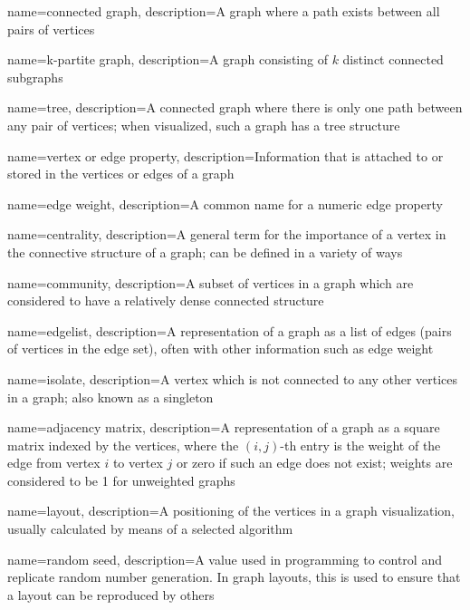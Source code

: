 {
    name={connected graph},
    description={A graph where a path exists between all pairs of vertices}
}

{
    name={k-partite graph},
    description={A graph consisting of $k$ distinct connected subgraphs}
}

{
    name={tree},
    description={A connected graph where there is only one path between any pair of vertices; when visualized, such a graph has a tree structure}
}

{
    name={vertex or edge property},
    description={Information that is attached to or stored in the vertices or edges of a graph}
}

{
    name={edge weight},
    description={A common name for a numeric edge property}
}

{
    name={centrality},
    description={A general term for the importance of a vertex in the connective structure of a graph; can be defined in a variety of ways}
}

{
    name={community},
    description={A subset of vertices in a graph which are considered to have a relatively dense connected structure}
}

{
    name={edgelist},
    description={A representation of a graph as a list of edges (pairs of vertices in the edge set), often with other information such as edge weight}
}

{
    name={isolate},
    description={A vertex which is not connected to any other vertices in a graph; also known as a singleton}
}

{
    name={adjacency matrix},
    description={A representation of a graph as a square matrix indexed by the vertices, where the $(i,j)$-th entry is the weight of the edge from vertex $i$ to vertex $j$ or zero if such an edge does not exist; weights are considered to be 1 for unweighted graphs}
}

{
    name={layout},
    description={A positioning of the vertices in a graph visualization, usually calculated by means of a selected algorithm}
}

{
    name={random seed},
    description={A value used in programming to control and replicate random number generation.  In graph layouts, this is used to ensure that a layout can be reproduced by others}
}

